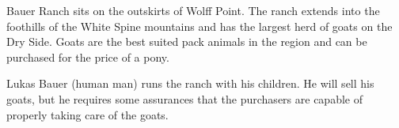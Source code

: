 Bauer Ranch sits on the outskirts of Wolff Point.
The ranch extends into the foothills of the White Spine mountains and has the largest herd of goats on the Dry Side.
Goats are the best suited pack animals in the region and can be purchased for the price of a pony.

Lukas Bauer (human man) runs the ranch with his children.
He will sell his goats, but he requires some assurances that the purchasers are capable of properly taking care of the goats.
